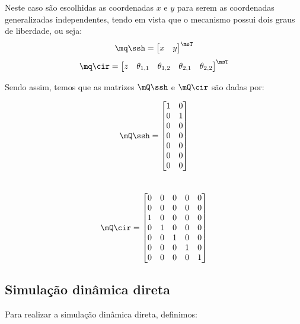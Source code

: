 \documentclass[]{politex}
\begin{document}
Neste caso são escolhidas as coordenadas $x$ e $y$ para serem as coordenadas generalizadas independentes, tendo em vista que o mecanismo possui dois graus de liberdade, ou seja:
\begin{equation}
\mq\ssh = \begin{bmatrix}
x & y
\end{bmatrix}^\msT
\end{equation}
\begin{equation}
\mq\cir = \begin{bmatrix}
z & \theta_{1,1} & \theta_{1,2} & \theta_{2,1} & \theta_{2,2}
\end{bmatrix}^\msT
\end{equation}

Sendo assim, temos que as matrizes $\mQ\ssh$ e $\mQ\cir$ são dadas por:
\begin{multicols}{2}
\begin{equation}
\mQ\ssh = \begin{bmatrix}
1 & 0 \\
0 & 1 \\
0 & 0 \\
0 & 0 \\
0 & 0 \\
0 & 0 \\
0 & 0 \\
\end{bmatrix}
\end{equation} \\
\begin{equation}
\mQ\cir = \begin{bmatrix}
0 & 0 & 0 & 0 & 0 \\
0 & 0 & 0 & 0 & 0 \\
1 & 0 & 0 & 0 & 0 \\
0 & 1 & 0 & 0 & 0 \\
0 & 0 & 1 & 0 & 0 \\
0 & 0 & 0 & 1 & 0 \\
0 & 0 & 0 & 0 & 1 \\
\end{bmatrix}
\end{equation}
\end{multicols}

\subsection{Simulação dinâmica direta}

Para realizar a simulação dinâmica direta, definimos:
\end{document}
